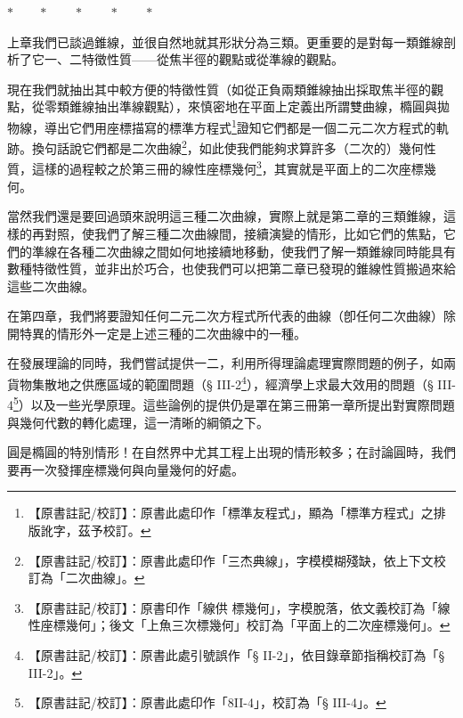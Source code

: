 \begin{center}
$* \qquad * \qquad * \qquad * \qquad *$
\end{center}

上章我們已談過錐線，並很自然地就其形狀分為三類。更重要的是對每一類錐線剖析了它一、二特徵性質——從焦半徑的觀點或從準線的觀點。

現在我們就抽出其中較方便的特徵性質（如從正負兩類錐線抽出採取焦半徑的觀點，從零類錐線抽出準線觀點），來慎密地在平面上定義出所謂雙曲線，橢圓與拋物線，導出它們用座標描寫的標準方程式\label{note:b4-ch3-biaozhunfangcheng}\footnote{【原書註記/校訂】：原書此處印作「標準友程式」，顯為「標準方程式」之排版訛字，茲予校訂。}證知它們都是一個二元二次方程式的軌跡。換句話說它們都是二次曲線\label{note:b4-ch3-ercichuxian}\footnote{【原書註記/校訂】：原書此處印作「三杰典線」，字模模糊殘缺，依上下文校訂為「二次曲線」。}，如此使我們能夠求算許多（二次的）幾何性質，這樣的過程較之於第三冊的線性座標幾何\label{note:b4-ch3-zuobiaojihe}\footnote{【原書註記/校訂】：原書印作「線供 標幾何」，字模脫落，依文義校訂為「線性座標幾何」；後文「上魚三次標幾何」校訂為「平面上的二次座標幾何」。}，其實就是平面上的二次座標幾何。

當然我們還是要回過頭來說明這三種二次曲線，實際上就是第二章的三類錐線，這樣的再對照，使我們了解三種二次曲線間，接續演變的情形，比如它們的焦點，它們的準線在各種二次曲線之間如何地接續地移動，使我們了解一類錐線同時能具有數種特徵性質，並非出於巧合，也使我們可以把第二章已發現的錐線性質搬過來給這些二次曲線。

在第四章，我們將要證知任何二元二次方程式所代表的曲線（卽任何二次曲線）除開特異的情形外一定是上述三種的二次曲線中的一種。

在發展理論的同時，我們嘗試提供一二，利用所得理論處理實際問題的例子，如兩貨物集散地之供應區域的範圍問題（§ III-2\label{note:b4-ch3-sec-ref-2}\footnote{【原書註記/校訂】：原書此處引號誤作「§ II-2」，依目錄章節指稱校訂為「§ III-2」。}），經濟學上求最大效用的問題（§ III-4\label{note:b4-ch3-sec-ref-4}\footnote{【原書註記/校訂】：原書此處印作「8II-4」，校訂為「§ III-4」。}）以及一些光學原理。這些論例的提供仍是罩在第三冊第一章所提出對實際問題與幾何代數的轉化處理，這一清晰的綱領之下。

圓是橢圓的特別情形！在自然界中尤其工程上出現的情形較多；在討論圓時，我們要再一次發揮座標幾何與向量幾何的好處。


